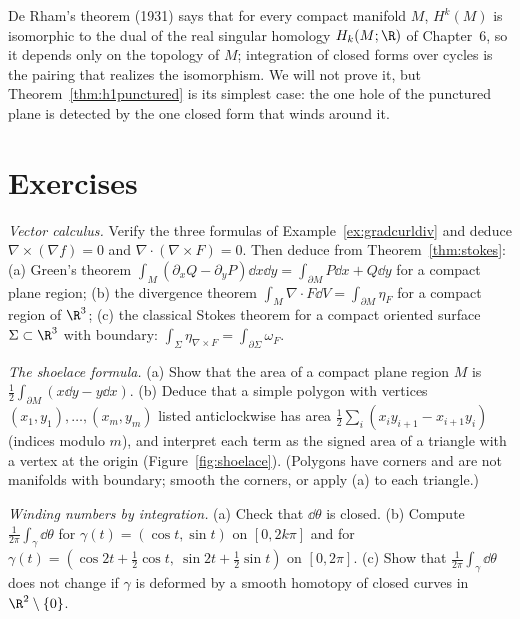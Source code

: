 \begin{remark}
De Rham's theorem (1931) says that for every compact manifold $M$, $H^k(M)$ is isomorphic to the dual of the real singular homology $H_k(M;\R)$ of Chapter~6, so it depends only on
the topology of $M$; integration of closed forms over cycles is the pairing that realizes the isomorphism. We will not prove it, but
Theorem~\ref{thm:h1punctured} is its simplest case: the one hole of the punctured plane is detected by the one closed form that winds around it.
\end{remark}

\section{Exercises}

\begin{exercise}[$\star$]\label{ex:gradcurl}
\emph{Vector calculus.} Verify the three formulas of Example~\ref{ex:gradcurldiv} and deduce $\nabla\times(\nabla f)=0$ and $\nabla\cdot(\nabla\times F)=0$. Then deduce from
Theorem~\ref{thm:stokes}: (a) Green's theorem $\int_M(\partial_xQ-\partial_yP)\dd x\dd y=\int_{\partial M}P\dd x+Q\dd y$ for a compact plane region; (b) the divergence theorem
$\int_M\nabla\cdot F\dd V=\int_{\partial M}\eta_F$ for a compact region of $\R^3$; (c) the classical Stokes theorem for a compact oriented surface $\Sigma\subset\R^3$ with
boundary: $\int_\Sigma\eta_{\nabla\times F}=\int_{\partial\Sigma}\omega_F$.
\end{exercise}

\begin{exercise}[$\star$]\label{ex:shoelace}
\emph{The shoelace formula.} (a) Show that the area of a compact plane region $M$ is $\frac12\int_{\partial M}(x\dd y-y\dd x)$. (b) Deduce that a simple polygon with
vertices $(x_1,y_1),\dots,(x_m,y_m)$ listed anticlockwise has area $\frac12\sum_i(x_iy_{i+1}-x_{i+1}y_i)$ (indices modulo $m$), and interpret each term as the signed area of
a triangle with a vertex at the origin (Figure~\ref{fig:shoelace}). (Polygons have corners and are not manifolds with boundary; smooth the corners, or apply
(a) to each triangle.)
\end{exercise}

\begin{exercise}[$\star$]\label{ex:windingcompute}
\emph{Winding numbers by integration.} (a) Check that $\dd\theta$ is closed. (b) Compute $\frac1{2\pi}\int_\gamma\dd\theta$ for $\gamma(t)=(\cos t,\sin t)$ on $[0,2k\pi]$ and for
$\gamma(t)=(\cos2t+\frac12\cos t,\ \sin2t+\frac12\sin t)$ on $[0,2\pi]$. (c) Show that $\frac1{2\pi}\int_\gamma\dd\theta$ does not change if $\gamma$ is deformed
by a smooth homotopy of closed curves in $\R^2\setminus\{0\}$.
\end{exercise}

